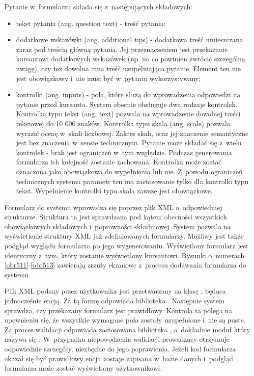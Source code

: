 \medskip
Pytanie w~formularzu składa się z~następujących składowych:
\begin{itemize}
    \item tekst pytania (ang. question text) - treść pytania;
    \item dodatkowe wskazówki (ang. additional tips) - dodatkowa treść umieszczana zaraz pod treścią główną pytania. Jej przeznaczeniem jest przekazanie kursantowi dodatkowych wskazówek (np. na co powinien zwrócić szczególną uwagę), czy też dowolna inna treść uzupełniająca pytanie. Element ten nie jest obowiązkowy i~nie musi być w~pytaniu wykorzystywany;
    \item kontrolki (ang. inputs) - pola, które służą do wprowadzenia odpowiedzi na pytanie przed kursanta. System obecnie obsługuje dwa rodzaje kontrolek. Kontrolka typu tekst (ang. text) pozwala na wprowadzenie dowolnej treści tekstowej do 10 000 znaków. Kontrolka typu skala (ang. scale) pozwala wyrazić ocenę w~skali liczbowej. Zakres skali, oraz jej znaczenie semantyczne jest bez znaczenia w~sensie technicznym. Pytanie może składać się z~wielu kontrolek - brak jest ograniczeń w~tym względzie. Podczas generowania formularza ich kolejność zostanie zachowana. Kontrolka może zostać oznaczona jako obowiązkowa do wypełnienia lub nie. Z~powodu ograniczeń technicznych systemu parametr ten ma zastosowanie tylko dla kontrolki typu tekst. Wypełnienie kontrolki typu skala zawsze jest obowiązkowe.
\end{itemize}

\clearpage
\medskip
Formularz do systemu wprowadza się poprzez plik XML o~odpowiedniej strukturze. Struktura ta jest sprawdzana pod kątem obecności wszystkich obowiązkowych składowych i~poprawności składniowej. System pozwala na wyświetlenie struktury XML już zdefiniowanych formularzy. Możliwy jest także podgląd wyglądu formularza po jego wygenerowaniu. Wyświetlony formularz jest identyczny z~tym, który zostanie wyświetlony kursantowi. Rysunki o~numerach \ref{obr511}-\ref{obr513} zawierają zrzuty ekranowe z~procesu dodawania formularza do systemu.

\medskip
Plik XML podany przez użytkownika jest przetwarzany na klasę , będąca jednocześnie encją. Za tą formę  odpowiada biblioteka . Następnie system sprawdza, czy przekazany formularz jest prawidłowy. Kontrola ta polega na upewnieniu się, że wszystkie wymagane pola zostały uzupełnione i~nie są puste. Za proces walidacji odpowiada zastosowana biblioteka , a~dokładnie moduł który nazywa się . W~przypadku niepowodzenia walidacji prowadzący otrzymuje odpowiednie szczegóły, niezbędne do jego poprawienia. Jeżeli kod formularza okazał się być prawidłowy encja zostaje zapisana w~bazie danych i~podgląd formularza może zostać wyświetlony użytkownikowi.

